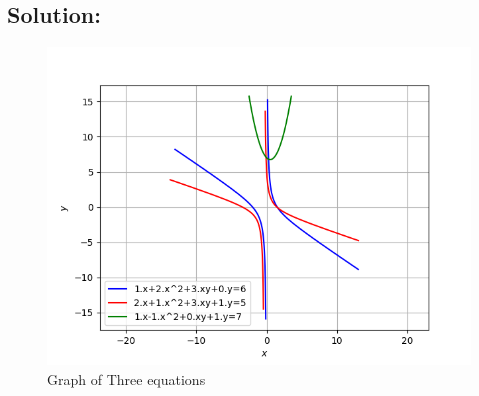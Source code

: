 \documentclass[journal,12pt,twocolumn]{IEEEtran}
\begin{document}
\subsection*{\textbf{Solution:}}
\renewcommand{\thefigure}{\arabic{figure}}
  \begin{figure}[!ht]
        \centering
        \includegraphics[width=\columnwidth]{plot.png}
        \caption{Graph of Three equations}
        \label{myfig}
\end{figure}
\end{document}
